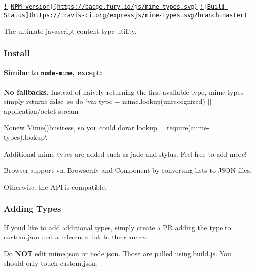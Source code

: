 \href{https://badge.fury.io/js/mime-types}{\tt !\mbox{[}N\+P\+M version\mbox{]}(https\+://badge.\+fury.\+io/js/mime-\/types.\+svg)} \href{https://travis-ci.org/expressjs/mime-types}{\tt !\mbox{[}Build Status\mbox{]}(https\+://travis-\/ci.\+org/expressjs/mime-\/types.\+svg?branch=master)}

The ultimate javascript content-\/type utility.

\subsubsection*{Install}




\paragraph*{Similar to \href{https://github.com/broofa/node-mime}{\tt node-\/mime}, except\+:}


\begin{DoxyItemize}
\item {\bfseries No fallbacks.} Instead of naively returning the first available type, {\ttfamily mime-\/types} simply returns {\ttfamily false}, so do `var type = mime.\+lookup(\textquotesingle{}unrecognized\textquotesingle{}) $\vert$$\vert$ \textquotesingle{}application/octet-\/stream
\item {\ttfamily No}new Mime(){\ttfamily business, so you could do}var lookup = require(\textquotesingle{}mime-\/types\textquotesingle{}).lookup`.
\item Additional mime types are added such as jade and stylus. Feel free to add more!
\item Browser support via Browserify and Component by converting lists to J\+S\+O\+N files.
\end{DoxyItemize}

Otherwise, the A\+P\+I is compatible.

\subsubsection*{Adding Types}

If you\textquotesingle{}d like to add additional types, simply create a P\+R adding the type to {\ttfamily custom.\+json} and a reference link to the sources.

Do {\bfseries N\+O\+T} edit {\ttfamily mime.\+json} or {\ttfamily node.\+json}. Those are pulled using {\ttfamily build.\+js}. You should only touch {\ttfamily custom.\+json}.

